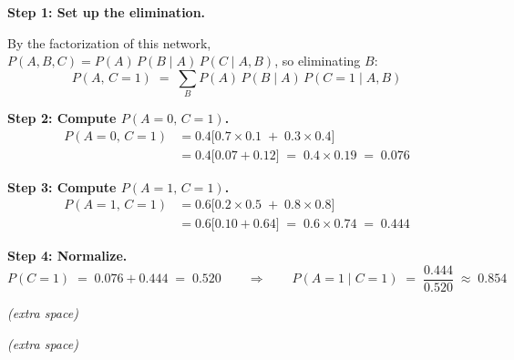 {\begin{sol}
\textbf{Step 1: Set up the elimination.}

By the factorization of this network, $P(A,B,C) = P(A)\,P(B\mid A)\,P(C\mid A,B)$, so eliminating $B$:
\[P(A,\,C{=}1) \;=\; \sum_{B} P(A)\,P(B\mid A)\,P(C{=}1\mid A, B)\]

\textbf{Step 2: Compute $P(A{=}0,\, C{=}1)$.}
\begin{align*}
P(A{=}0,\,C{=}1)
  &= 0.4\bigl[0.7 \times 0.1 \;+\; 0.3 \times 0.4\bigr]\\
  &= 0.4\bigl[0.07 + 0.12\bigr] \;=\; 0.4 \times 0.19 \;=\; 0.076
\end{align*}

\textbf{Step 3: Compute $P(A{=}1,\, C{=}1)$.}
\begin{align*}
P(A{=}1,\,C{=}1)
  &= 0.6\bigl[0.2 \times 0.5 \;+\; 0.8 \times 0.8\bigr]\\
  &= 0.6\bigl[0.10 + 0.64\bigr] \;=\; 0.6 \times 0.74 \;=\; 0.444
\end{align*}

\textbf{Step 4: Normalize.}
\[
P(C{=}1) \;=\; 0.076 + 0.444 \;=\; 0.520
\qquad\Longrightarrow\qquad
P(A{=}1\mid C{=}1) \;=\; \frac{0.444}{0.520} \;\approx\; \mathbf{0.854}
\]
\end{sol}
}

\clearpage

\begin{center}
    \textit{(extra space)}
\end{center}

\clearpage

\begin{center}
    \textit{(extra space)}
\end{center}

\clearpage